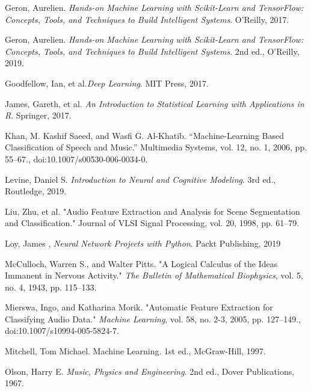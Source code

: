 \documentclass[12pt,letterpaper]{article}
\begin{document}

\newpage

\begin{thebibliography}{9}


Geron, Aurelien. \textit{Hands-on Machine Learning with Scikit-Learn and TensorFlow: Concepts, Tools, and Techniques to Build Intelligent Systems}. O'Reilly, 2017.

Geron, Aurelien. \textit{Hands-on Machine Learning with Scikit-Learn and TensorFlow: Concepts, Tools, and Techniques to Build Intelligent Systems}. 2nd ed., O'Reilly, 2019.

Goodfellow, Ian, et al.\textit{Deep Learning}. MIT Press, 2017.

James, Gareth, et al. \textit{An Introduction to Statistical Learning with Applications in R}. Springer, 2017.

Khan, M. Kashif Saeed, and Wasfi G. Al-Khatib. “Machine-Learning Based Classification of Speech and Music.” Multimedia Systems, vol. 12, no. 1, 2006, pp. 55–67., doi:10.1007/s00530-006-0034-0.

Levine, Daniel S. \textit{Introduction to Neural and Cognitive Modeling}. 3rd ed., Routledge, 2019.

Liu, Zhu, et al. "Audio Feature Extraction and Analysis for Scene Segmentation and Classification." Journal of VLSI Signal Processing, vol. 20, 1998, pp. 61–79.

Loy, James , \textit{Neural Network Projects with Python}. Packt Publishing, 2019

McCulloch, Warren S., and Walter Pitts. "A Logical Calculus of the Ideas Immanent in Nervous Activity." \textit{The Bulletin of Mathematical Biophysics}, vol. 5, no. 4, 1943, pp. 115–133.

Mierswa, Ingo, and Katharina Morik. "Automatic Feature Extraction for Classifying Audio Data." \textit{Machine Learning}, vol. 58, no. 2-3, 2005, pp. 127–149., doi:10.1007/s10994-005-5824-7.

Mitchell, Tom Michael. Machine Learning. 1st ed., McGraw-Hill, 1997.

Olson, Harry E. \textit{Music, Physics and Engineering}. 2nd ed., Dover Publications, 1967.


\end{thebibliography}
\end{document}
